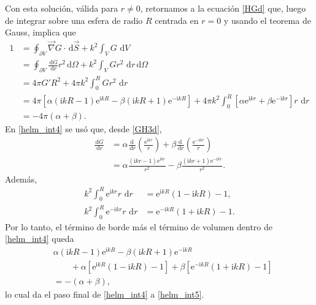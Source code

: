 \documentclass[11pt]{article}
\newcommand{\dd}{\,\mathrm{d}}
\newcommand{\ii}{\mathrm{i}}
\newcommand{\e}{\mathrm{e}}
\begin{document}
Con esta solución, válida para $r\neq0$, retornamos a la ecuación \eqref{HGd} que, luego de integrar sobre una esfera de radio $R$ centrada en $r=0$ y usando el teorema de Gauss, implica que
\begin{align}
1 &= \oint_{\partial V}\vec\nabla G\cdot \dd\vec{S}+k^2\int_VG\,\dd V \label{helm_int1}\\
&= \oint_{\partial V}\frac{\dd G}{\dd r}r^2\dd\Omega+k^2\int_VGr^2\,\dd r\dd\Omega \label{helm_int2}\\
&= 4\pi G'R^2+4\pi k^2\int_0^R Gr^2\,\dd r \label{helm_int3}\\
&= 4\pi\left[\alpha\left(\ii kR-1\right)\e^{\ii kR}-\beta\left(\ii kR+1\right)\e^{-\ii kR}\right]
+4\pi k^2\int_0^R \left[\alpha\e^{\ii kr}+\beta\e^{-\ii kr}\right]r\,\dd r \label{helm_int4}\\
&= -4\pi(\alpha+\beta). \label{helm_int5}
\end{align}
En \eqref{helm_int4} se usó que, desde \eqref{GH3d},
\begin{align*}
\frac{\dd G}{\dd r}
&=\alpha\frac{\dd\ }{\dd r}\left(\frac{\e^{\ii kr}}{r}\right)
+\beta\frac{\dd\ }{\dd r}\left(\frac{\e^{-\ii kr}}{r}\right)\\
&=\alpha\frac{(\ii kr-1)\e^{\ii kr}}{r^2}
-\beta\frac{(\ii kr+1)\e^{-\ii kr}}{r^2}.
\end{align*}
Además,
\begin{align*}
k^2\int_0^R \e^{\ii kr}r\,\dd r &= \e^{\ii kR}(1-\ii kR)-1,\\
k^2\int_0^R \e^{-\ii kr}r\,\dd r &= \e^{-\ii kR}(1+\ii kR)-1.
\end{align*}
Por lo tanto, el término de borde más el término de volumen dentro de \eqref{helm_int4} queda
\begin{align*}
&\alpha(\ii kR-1)\e^{\ii kR}-\beta(\ii kR+1)\e^{-\ii kR}\\
&\qquad +\alpha\left[\e^{\ii kR}(1-\ii kR)-1\right]
+\beta\left[\e^{-\ii kR}(1+\ii kR)-1\right]\\
&=-(\alpha+\beta),
\end{align*}
lo cual da el paso final de \eqref{helm_int4} a \eqref{helm_int5}.
\end{document}
